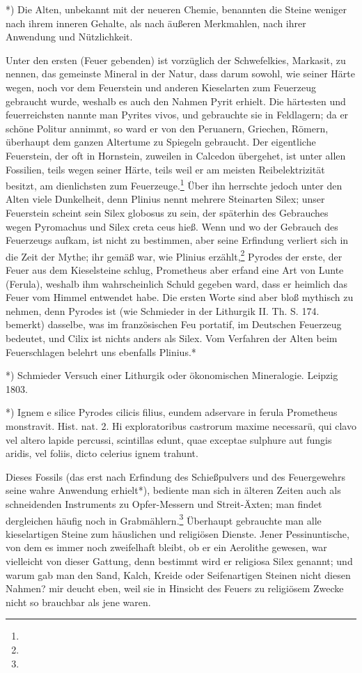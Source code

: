 \documentclass[a4paper, 11pt, oneside, polutonikogreek, german]{article}
\begin{document}
*) Die Alten, unbekannt mit der neueren Chemie, benannten die Steine weniger nach ihrem inneren Gehalte, als nach äußeren Merkmahlen, nach ihrer Anwendung und Nützlichkeit.

Unter den ersten (Feuer gebenden) ist vorzüglich der Schwefelkies, Markasit, zu nennen, das gemeinste Mineral in der Natur, dass darum sowohl, wie seiner Härte wegen, noch vor dem Feuerstein und anderen Kieselarten zum Feuerzeug gebraucht wurde, weshalb es auch den Nahmen Pyrit erhielt. Die härtesten und feuerreichsten nannte man Pyrites vivos, und gebrauchte sie in Feldlagern; da er schöne Politur annimmt, so ward er von den Peruanern, Griechen, Römern, überhaupt dem ganzen Altertume zu Spiegeln gebraucht. Der eigentliche Feuerstein, der oft in Hornstein, zuweilen in Calcedon übergehet, ist unter allen Fossilien, teils wegen seiner Härte, teils weil er am meisten Reibelektrizität besitzt, am dienlichsten zum Feuerzeuge.\footnote{} Über ihn herrschte jedoch unter den Alten viele Dunkelheit, denn Plinius nennt mehrere Steinarten Silex; unser Feuerstein scheint sein Silex globosus zu sein, der späterhin des Gebrauches wegen Pyromachus und Silex creta ceus hieß. Wenn und wo der Gebrauch des Feuerzeugs aufkam, ist nicht zu bestimmen, aber seine Erfindung verliert sich in die Zeit der Mythe; ihr gemäß war, wie Plinius erzählt,\footnote{} Pyrodes der erste, der Feuer aus dem Kieselsteine schlug, Prometheus aber erfand eine Art von Lunte (Ferula), weshalb ihm wahrscheinlich Schuld gegeben ward, dass er heimlich das Feuer vom Himmel entwendet habe. Die ersten Worte sind aber bloß mythisch zu nehmen, denn Pyrodes ist (wie Schmieder in der Lithurgik II. Th. S. 174. bemerkt) dasselbe, was im französischen Feu portatif, im Deutschen Feuerzeug bedeutet, und Cilix ist nichts anders als Silex. Vom Verfahren der Alten beim Feuerschlagen belehrt uns ebenfalls Plinius.*

*) Schmieder Versuch einer Lithurgik oder ökonomischen Mineralogie. Leipzig 1803.

*) Ignem e silice Pyrodes cilicis filius, eundem adservare in ferula Prometheus monstravit. Hist. nat.
2. Hi exploratoribus castrorum maxime necessarü, qui clavo vel altero lapide percussi, scintillas edunt, quae exceptae sulphure aut fungis aridis, vel foliis, dicto celerius ignem trahunt.

Dieses Fossils (das erst nach Erfindung des Schießpulvers und des Feuergewehrs seine wahre Anwendung erhielt*), bediente man sich in älteren Zeiten auch als schneidenden Instruments zu Opfer-Messern und Streit-Äxten; man findet dergleichen häufig noch in Grabmählern.\footnote{} Überhaupt gebrauchte man alle kieselartigen Steine zum häuslichen und religiösen Dienste. Jener Pessinuntische, von dem es immer noch zweifelhaft bleibt, ob er ein Aerolithe gewesen, war vielleicht von dieser Gattung, denn bestimmt wird er religiosa Silex genannt; und warum gab man den Sand, Kalch, Kreide oder Seifenartigen Steinen nicht diesen Nahmen? mir deucht eben, weil sie in Hinsicht des Feuers zu religiösem Zwecke nicht so brauchbar als jene waren.
\end{document}
